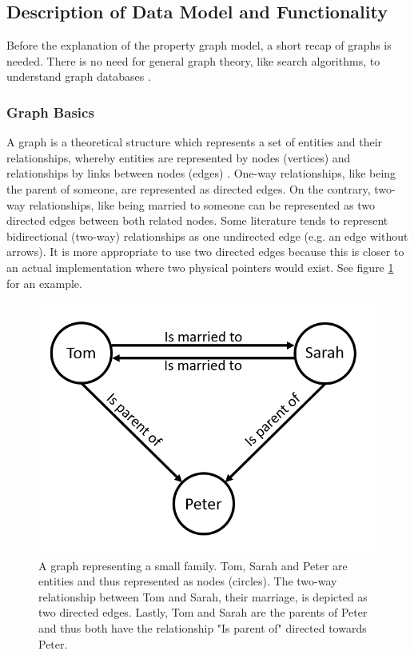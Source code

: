 \subsection{Description of Data Model and Functionality}
Before the explanation of the property graph model, a short recap of graphs is needed. There is no need for general graph theory, like search algorithms, to understand graph databases \autocite{graphdb2015}.

\subsubsection{Graph Basics}
A graph is a theoretical structure which represents a set of entities and their relationships, whereby entities are represented by nodes (vertices) and relationships by links between nodes (edges) \autocite{maheshlal2015, graphdb2015}. One-way relationships, like being the parent of someone, are represented as directed edges. On the contrary, two-way relationships, like being married to someone can be represented as two directed edges between both related nodes. Some literature tends to represent bidirectional (two-way) relationships as one undirected edge (e.g. an edge without arrows). It is more appropriate to use two directed edges because this is closer to an actual implementation where two physical pointers would exist. See figure \ref{fig:graphdb:graph_example} for an example.

\begin{figure}[ht]
    \centering
    \includegraphics[width=.5\textwidth]{img/graph_example.PNG}
    \caption{A graph representing a small family. Tom, Sarah and Peter are entities and thus represented as nodes (circles). The two-way relationship between Tom and Sarah, their marriage, is depicted as two directed edges. Lastly, Tom and Sarah are the parents of Peter and thus both have the relationship "Is parent of" directed towards Peter.}
    \label{fig:graphdb:graph_example}
\end{figure}



